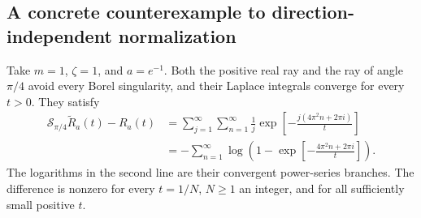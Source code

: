 \subsection{A concrete counterexample to direction-independent normalization}

\begin{proposition}
\label{thm:direction-counterexample}
Take $m=1$, $\zeta=1$, and $a=e^{-1}$.  Both the positive real ray and
the ray of angle $\pi/4$ avoid every Borel singularity, and their
Laplace integrals converge for every $t>0$.  They satisfy
\begin{align}
 \mathcal S_{\pi/4}\widetilde R_a(t)-R_a(t)
 &=\sum_{j=1}^{\infty}\sum_{n=1}^{\infty}
       \frac{1}{j}
       \exp\!\left[-\frac{j(4\pi^2n+2\pi i)}{t}\right]
       \label{eq:cb-counterexample-sum}\\
 &=-\sum_{n=1}^{\infty}
       \log\!\left(1-
          \exp\!\left[-\frac{4\pi^2n+2\pi i}{t}\right]\right).
       \label{eq:cb-counterexample-product}
\end{align}
The logarithms in the second line are their convergent power-series
branches.  The difference is nonzero for every $t=1/N$, $N\geq1$ an
integer, and for all sufficiently small positive $t$.
\end{proposition}


